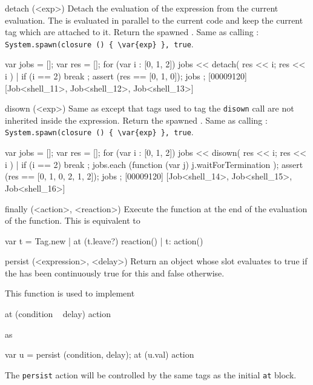 \begin{urbiscriptapi}
\item[detach](<exp>)%
  Detach the evaluation of the expression  from the current
  evaluation.  The  is evaluated in parallel to the current code
  and keep the current tag which are attached to it.  Return the spawned
  .  Same as calling :
  \lstinline|System.spawn(closure () { \var{exp} }, true|.

\begin{urbiscript}
{
  var jobs = [];
  var res = [];
  for (var i : [0, 1, 2])
  {
    jobs << detach({ res << i; res << i }) |
    if (i == 2)
      break
  };
  assert (res == [0, 1, 0]);
  jobs
};
[00009120] [Job<shell_11>, Job<shell_12>, Job<shell_13>]
\end{urbiscript}


\item[disown](<exp>)%
  Same as  except that tags used to tag the
  \lstinline|disown| call are not inherited inside the expression.  Return
  the spawned .  Same as calling :
  \lstinline|System.spawn(closure () { \var{exp} }, true|.

\begin{urbiscript}
{
  var jobs = [];
  var res = [];
  for (var i : [0, 1, 2])
  {
    jobs << disown({ res << i; res << i }) |
    if (i == 2)
      break
  };
  jobs.each (function (var j) { j.waitForTermination });
  assert (res == [0, 1, 0, 2, 1, 2]);
  jobs
};
[00009120] [Job<shell_14>, Job<shell_15>, Job<shell_16>]
\end{urbiscript}


\item[finally](<action>, <reaction>)%
  Execute the  function at the end of the evaluation of
  the  function.  This is equivalent to

\begin{urbiunchecked}
{
  var t = Tag.new |
  at (t.leave?)
    reaction() |
  t: action()
}
\end{urbiunchecked}


\item[persist](<expression>, <delay>)%
  Return an object whose  slot evaluates to true if the
   has been continuously true for this  and false
  otherwise.

  This function is used to implement

\begin{urbiunchecked}
at (condition ~ delay)
  action
\end{urbiunchecked}

  \noindent
  as

\begin{urbiunchecked}
var u = persist (condition, delay);
at (u.val)
  action
\end{urbiunchecked}

  The \lstinline|persist| action will be controlled by the same tags
  as the initial \lstinline|at| block.



\end{urbiscriptapi}


